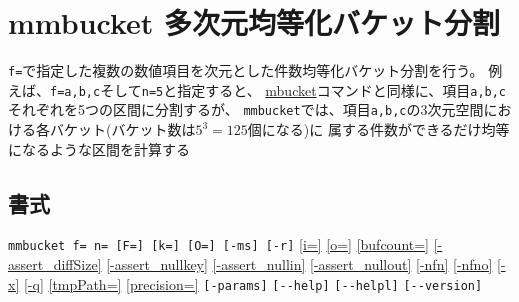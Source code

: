 
%

\section{mmbucket 多次元均等化バケット分割\label{sect:mmbucket}}

\verb|f=|で指定した複数の数値項目を次元とした件数均等化バケット分割を行う。
例えば、\verb|f=a,b,c|そして\verb|n=5|と指定すると、
\hyperref[sect:mbucket]{mbucket}コマンドと同様に、項目\verb|a,b,c|それぞれを5つの区間に分割するが、
\verb|mmbucket|では、項目\verb|a,b,c|の3次元空間における各バケット(バケット数は$5^3=125$個になる)に
属する件数ができるだけ均等になるような区間を計算する

\subsection*{書式}
\verb|mmbucket f= n= [F=] [k=] [O=] [-ms] [-r]| 
\hyperref[sect:option_i]{[i=]}
\hyperref[sect:option_o]{[o=]}
\hyperref[sect:option_bufcount]{[bufcount=]} 
\hyperref[sect:option_assert_diffSize]{[-assert\_diffSize]}
\hyperref[sect:option_assert_nullkey]{[-assert\_nullkey]}
\hyperref[sect:option_assert_nullin]{[-assert\_nullin]}
\hyperref[sect:option_assert_nullout]{[-assert\_nullout]}
\hyperref[sect:option_nfn]{[-nfn]} 
\hyperref[sect:option_nfno]{[-nfno]}  
\hyperref[sect:option_x]{[-x]}
\hyperref[sect:option_q]{[-q]}
\hyperref[sect:option_option_tmppath]{[tmpPath=]}
\hyperref[sect:option_precision]{[precision=]}
\verb|[-params]|
\verb|[--help]|
\verb|[--helpl]|
\verb|[--version]|\\

